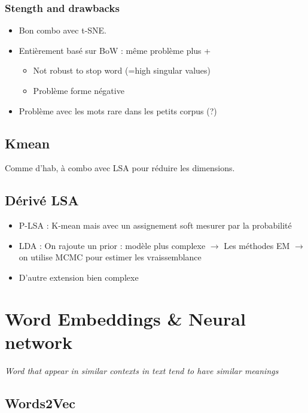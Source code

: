 \documentclass{article}
\theoremstyle{plain}%
\theoremstyle{definition}
\theoremstyle{remark}
\begin{document}
\subsubsection{Stength and drawbacks}
\begin{itemize}
    \item Bon combo avec t-SNE.
    \item Entièrement basé sur BoW : même problème  plus +\begin{itemize}
        \item Not robust to stop word (=high singular values)
        \item Problème forme négative 
    \end{itemize}
    \item Problème avec les mots rare dans les petits corpus (?)
\end{itemize}

\subsection{Kmean}
Comme d'hab, à combo avec LSA pour réduire les dimensions. 
\subsection{Dérivé LSA}
\begin{itemize}
    \item P-LSA : K-mean mais avec un assignement soft mesurer par la probabilité
    \item LDA : On rajoute un prior : modèle plus complexe $\rightarrow$ Les méthodes EM  $\rightarrow$ on utilise MCMC pour estimer les vraissemblance
    \item D'autre extension bien complexe
\end{itemize}





\section{Word Embeddings \& Neural network}
{\large \begin{center}
\textit{Word that appear in similar contexts in text tend to have similar meanings}
\end{center}}

\subsection{Words2Vec}
\end{document}
